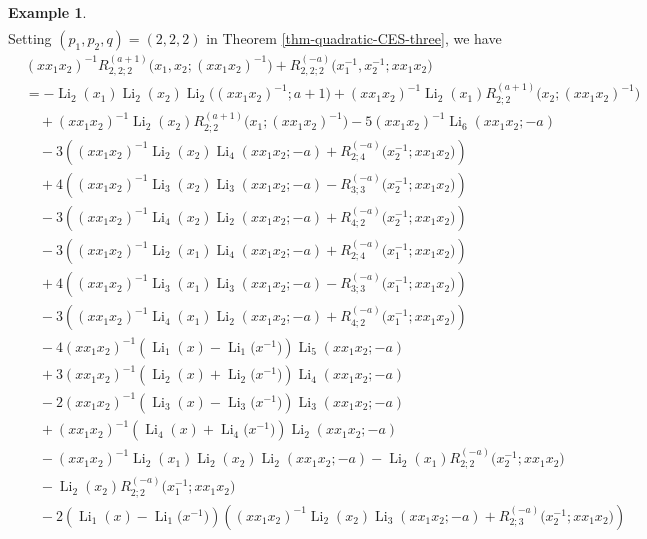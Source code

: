 \documentclass[11pt]{article}
\DeclareMathOperator{\Li}{Li}
\theoremstyle{plain}
\theoremstyle{definition}
\newtheorem{exa}[thm]{Example}
\begin{document}
\begin{exa}
\begin{align*}
\end{align*}
Setting $(p_1,p_2,q)=(2,2,2)$ in Theorem \ref{thm-quadratic-CES-three}, we have
\begin{align*}
	&(xx_1x_2)^{-1}R^{(a+1)}_{2,2;2}\Big(x_1,x_2;(xx_1x_2)^{-1}\Big)+R_{2,2;2}^{(-a)}\Big(x_1^{-1},x_2^{-1};xx_1x_2\Big)\\
	&=-\Li_{2}(x_1)\Li_{2}(x_2)\Li_2\Big((xx_1x_2)^{-1};a+1\Big)+(xx_1x_2)^{-1}\Li_{2}(x_1)R^{(a+1)}_{2;2}\Big(x_2;(xx_1x_2)^{-1}\Big)\nonumber\\
	&\quad+(xx_1x_2)^{-1}\Li_{2}(x_2)R^{(a+1)}_{2;2}\Big(x_1;(xx_1x_2)^{-1}\Big)-5(xx_1x_2)^{-1}\Li_{6}(xx_1x_2;-a)\nonumber\\
	&\quad-3\left((xx_1x_2)^{-1}\Li_{2}(x_{2})\Li_{4}(xx_1x_{2};-a)+R_{2;4}^{(-a)}\Big(x_2^{-1};xx_1x_2\Big)\right)\\
	&\quad+4\left((xx_1x_2)^{-1}\Li_{3}(x_{2})\Li_{3}(xx_1x_{2};-a)-R_{3;3}^{(-a)}\Big(x_2^{-1};xx_1x_2\Big)\right)\nonumber\\
	&\quad-3\left((xx_1x_2)^{-1}\Li_{4}(x_{2})\Li_{2}(xx_1x_{2};-a)+R_{4;2}^{(-a)}\Big(x_2^{-1};xx_1x_2\Big)\right)\nonumber\\
	&\quad-3\left((xx_1x_2)^{-1}\Li_{2}(x_{1})\Li_{4}(xx_1x_{2};-a)+R_{2;4}^{(-a)}\Big(x_1^{-1};xx_1x_2\Big)\right)\\
	&\quad+4\left((xx_1x_2)^{-1}\Li_{3}(x_{1})\Li_{3}(xx_1x_{2};-a)-R_{3;3}^{(-a)}\Big(x_1^{-1};xx_1x_2\Big)\right)\nonumber\\
	&\quad-3\left((xx_1x_2)^{-1}\Li_{4}(x_{1})\Li_{2}(xx_1x_{2};-a)+R_{4;2}^{(-a)}\Big(x_1^{-1};xx_1x_2\Big)\right)\\
	&\quad-4(xx_1x_2)^{-1}\left(\Li_{1}(x)-\Li_{1}\Big(x^{-1}\Big)\right)\Li_{5}(xx_1x_2;-a)\nonumber\\
	&\quad+3(xx_1x_2)^{-1}\left(\Li_{2}(x)+\Li_{2}\Big(x^{-1}\Big)\right)\Li_{4}(xx_1x_2;-a)\nonumber\\
	&\quad-2(xx_1x_2)^{-1}\left(\Li_{3}(x)-\Li_{3}\Big(x^{-1}\Big)\right)\Li_{3}(xx_1x_2;-a)\nonumber\\
	&\quad+(xx_1x_2)^{-1}\left(\Li_{4}(x)+\Li_{4}\Big(x^{-1}\Big)\right)\Li_{2}(xx_1x_2;-a)\nonumber\\
	&\quad-(xx_1x_2)^{-1}\Li_{2}(x_1)\Li_{2}(x_2)\Li_2(xx_1x_2;-a)-\Li_{2}(x_1)R_{2;2}^{(-a)}\Big(x_2^{-1};xx_1x_2\Big)\nonumber\\
	&\quad-\Li_{2}(x_2)R_{2;2}^{(-a)}\Big(x_1^{-1};xx_1x_2\Big)\nonumber\\
	&\quad-2\left(\Li_{1}(x)-\Li_{1}\Big(x^{-1}\Big)\right)\left((xx_1x_2)^{-1}\Li_{2}(x_{2})\Li_{3}(xx_1x_{2};-a)+R^{(-a)}_{2;3}\Big(x_{2}^{-1};xx_1x_2\Big)\right)\\

\end{align*}
\end{exa}
\end{document}
